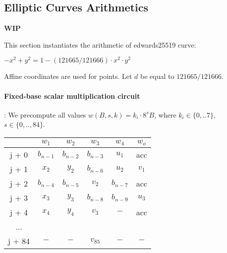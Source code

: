 \subsection{Elliptic Curves Arithmetics}
\label{ellcurve}
\textbf{WIP}

This section instantiates the arithmetic of edwards25519 curve:
\begin{center}
    $- x^2 + y^2 = 1 - (121665/121666) \cdot x^2 \cdot y^2$
\end{center}
Affine coordinates are used for points.
Let $d$ be equal to $121665/121666$.

\paragraph{Fixed-base scalar multiplication circuit}:
We precompute all values $w(B,s,k) = k_i \cdot 8^s B$, where $k_i \in \{ 0,..7 \}$, $s \in \{0,.., 84\}$.
\begin{center}
    \begin{tabular}{ c|c|c|c|c|c }
        & $w_1$       & $w_2$       & $w_3$       & $w_4$       & $w_o$ \\
        \hline
        j + 0  & $b_{n - 1}$ & $b_{n - 2}$ & $b_{n - 3}$ & $u_1$       & acc   \\
        j + 1  & $x_2$       & $y_2$       & $b_{n - 6}$ & $u_2$       & $v_1$ \\
        j + 2  & $b_{n - 4}$ & $b_{n - 5}$ & $v_2$       & $b_{n - 7}$ & acc   \\
        j + 3  & $x_3$       & $ y_3$      & $b_{n - 8}$ & $b_{n - 9}$ & $u_3$ \\
        j + 4  & $x_4$       & $y_4$       & $v_3$       & $-$         & acc   \\
        ...    &             &             &             &             &       \\
        j + 84 & $-$         & $-$         & $v_{85}$    & $-$         & $-$   \\
    \end{tabular}
\end{center}

